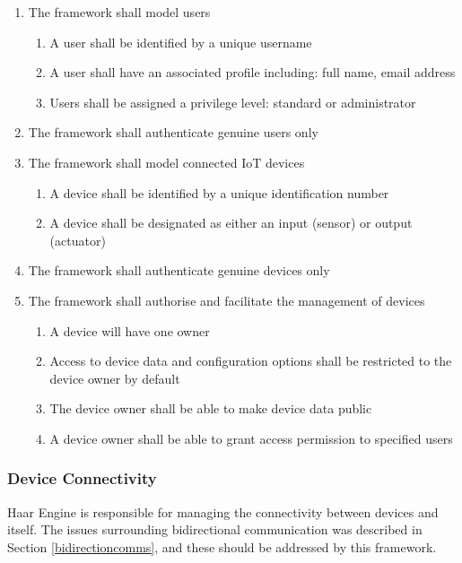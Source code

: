         \begin{enumerate}
          \item The framework shall model users
          \begin{enumerate}
            \item A user shall be identified by a unique username
            \item A user shall have an associated profile including: full name, email address
            \item Users shall be assigned a privilege level: standard or administrator
          \end{enumerate}
          \item The framework shall authenticate genuine users only

          \item The framework shall model connected IoT devices
          \begin{enumerate}
            \item A device shall be identified by a unique identification number
            \item A device shall be designated as either an input (sensor) or output (actuator)
          \end{enumerate}
          \item The framework shall authenticate genuine devices only

          \item The framework shall authorise and facilitate the management of devices
          \begin{enumerate}
            \item A device will have one owner
            \item Access to device data and configuration options shall be restricted to the device owner by default
            \item The device owner shall be able to make device data public
            \item A device owner shall be able to grant access permission to specified users
          \end{enumerate}
        \end{enumerate}

      \subsubsection{Device Connectivity}
        Haar Engine is responsible for managing the connectivity between devices and itself. The issues surrounding bidirectional communication was described in Section \ref{bidirectioncomms}, and these should be addressed by this framework.

